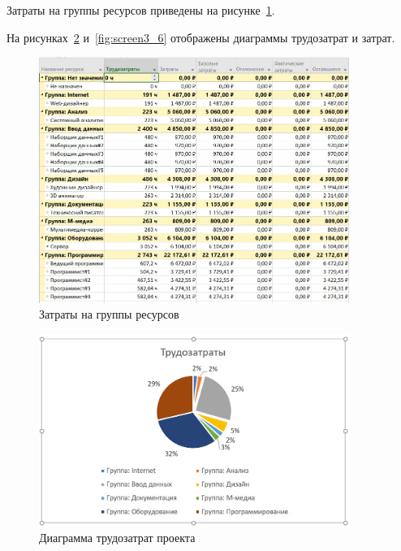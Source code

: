 Затраты на группы ресурсов приведены на рисунке~\ref{fig:screen3_7}.

На рисунках~\ref{fig:screen3_5} и~\ref{fig:screen3_6} отображены диаграммы трудозатрат и затрат.

\begin{figure}[H]
	\centering
	\includegraphics[width=0.9\textwidth]{img/task3/screen10.jpg}
	\caption{Затраты на группы ресурсов}
	\label{fig:screen3_7}
\end{figure}

\begin{figure}[H]
	\centering
	\includegraphics[width=0.9\textwidth]{img/task3/screen5.jpg}
	\caption{Диаграмма трудозатрат проекта}
	\label{fig:screen3_5}
\end{figure}

